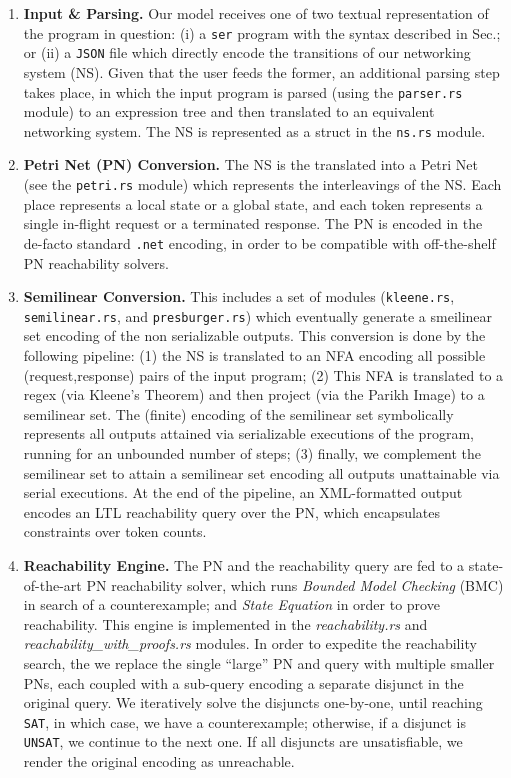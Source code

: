 \begin{enumerate}
	\item \textbf{Input \& Parsing.} Our model receives one of two textual representation of the program in question: (i) a \texttt{ser} program with the syntax described in Sec.; or (ii) a \texttt{JSON} file which directly encode the transitions of our networking system (NS). Given that the user feeds the former, an additional parsing step takes place, in which the input program is parsed (using the \texttt{parser.rs} module) to an expression tree and then translated to an equivalent networking system. The NS is represented as a struct in the \texttt{ns.rs} module. 
	
	\item \textbf{Petri Net (PN) Conversion.} The NS is the translated into a Petri Net (see the \texttt{petri.rs} module) which represents the interleavings of the NS. Each place represents a local state or a global state, and each token represents a single in-flight request or a terminated response. The PN is encoded in the de-facto standard \texttt{.net} encoding, in order to be compatible with off-the-shelf PN reachability solvers. 
	
	\item \textbf{Semilinear Conversion.} 
	This includes a set of modules (\texttt{kleene.rs}, \texttt{semilinear.rs}, and \texttt{presburger.rs}) which eventually generate a smeilinear set encoding of the non serializable outputs. This conversion is done by the following pipeline: (1) the NS is translated to an NFA encoding all possible (request,response) pairs of the input program; (2) This NFA is translated to a regex (via Kleene's Theorem) and then project (via the Parikh Image) to a semilinear set. The (finite) encoding of the semilinear set symbolically represents all outputs attained via serializable executions of the program, running for an unbounded number of steps; (3) finally, we complement the semilinear set to attain a semilinear set encoding all outputs unattainable via serial executions. At the end of the pipeline, an {XML}-formatted output encodes an LTL reachability query over the PN, which encapsulates constraints over token counts.
	
	
	\item \textbf{Reachability Engine.} The PN and the reachability query are fed to a state-of-the-art PN reachability solver, which runs \textit{Bounded Model Checking} (BMC) in search of a counterexample; and \textit{State Equation} in order to prove reachability. This engine is implemented in the \textit{reachability.rs} and \textit{reachability\_with\_proofs.rs}  modules.
	In order to expedite the reachability search, the we replace the single ``large'' PN and query with multiple smaller PNs, each coupled with a sub-query encoding a separate disjunct in the original query.
	We iteratively solve the disjuncts one-by-one, until reaching \texttt{SAT}, in which case, we have a counterexample; otherwise, if a disjunct is \texttt{UNSAT}, we continue to the next one. If all disjuncts are unsatisfiable, we render the original encoding as unreachable.
	

\end{enumerate}
